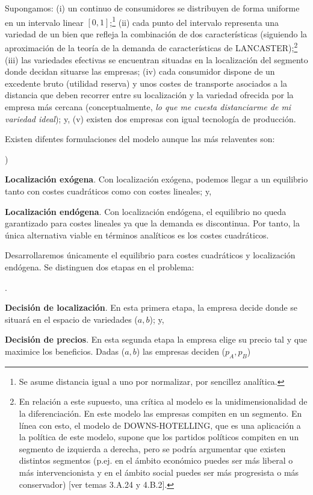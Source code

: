 \documentclass[10pt,a4paper]{article}
\newcounter{alphaitem}
\newcounter{numitem}
\newenvironment{la}
      {\begin{list}{\alph{alphaitem})}{%
          \usecounter{alphaitem}%
          \setlength{\leftmargin}{1cm}%
          \setlength{\parskip}{3pt}%
          \setlength{\itemsep}{0pt}%
          \setlength{\parsep}{0pt}%
      }}
      {\end{list}}
\newenvironment{lnum}
      {\begin{list}{\arabic{numitem}.}{%
          \usecounter{numitem}%
          \setlength{\leftmargin}{1cm}%
          \setlength{\parskip}{3pt}%
          \setlength{\itemsep}{0pt}%
          \setlength{\parsep}{0pt}%
      }}
      {\end{list}}
\begin{document}
Supongamos: (i) un continuo de consumidores se distribuyen de forma uniforme en un intervalo linear $[0,1]$;\footnote{Se asume distancia igual a uno por normalizar, por sencillez analítica.
} (ii) cada punto del intervalo representa una variedad de un bien que refleja la combinación de dos características (siguiendo la aproximación de la teoría de la demanda de características de LANCASTER);\footnote{%
    En relación a este supuesto, una crítica al modelo es la unidimensionalidad de la diferenciación. En este modelo las empresas compiten en un segmento. En línea con esto, el modelo de DOWNS-HOTELLING, que es una aplicación a la política de este modelo, supone que los partidos políticos compiten en un segmento de izquierda a derecha, pero se podría argumentar que existen distintos segmentos (p.ej. en el ámbito económico puedes ser más liberal o más intervencionista y en el ámbito social puedes ser más progresista o más conservador) [ver temas 3.A.24 y 4.B.2].
} (iii) las variedades efectivas se encuentran situadas en la localización del segmento donde decidan situarse las empresas; (iv) cada consumidor dispone de un excedente bruto (utilidad reserva) y unos costes de transporte asociados a la distancia que deben recorrer entre su localización y la variedad ofrecida por la empresa más cercana (conceptualmente, \textit{lo que me cuesta distanciarme de mi variedad ideal}); y, (v) existen dos empresas con igual tecnología de producción.

Existen difentes formulaciones del modelo aunque las más relaventes son:
\begin{la}
    \item \textbf{Localización exógena}. Con localización exógena, podemos llegar a un equilibrio tanto con costes cuadráticos como con costes lineales; y,
    \item \textbf{Localización endógena}. Con localización endógena, el equilibrio no queda garantizado para costes lineales ya que la demanda es discontinua. Por tanto, la única alternativa viable en términos analíticos es los costes cuadráticos.
\end{la}

Desarrollaremos únicamente el equilibrio para costes cuadráticos y localización endógena. Se distinguen dos etapas en el problema:
\begin{lnum}
    \item \textbf{Decisión de localización}. En esta primera etapa, la empresa decide donde se situará en el espacio de variedades ($a,b$); y,
    \item \textbf{Decisión de precios}. En esta segunda etapa la empresa elige su precio tal y que maximice los beneficios. Dadas ($a,b$) las empresas deciden ($p_A,p_B$)
\end{lnum}
\end{document}

